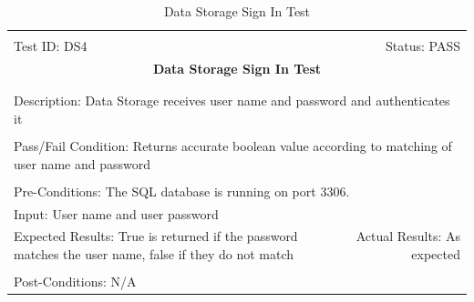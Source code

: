 \documentclass[11pt]{article}
\begin{document}
\begin{center}
\begin{table}[H]
\begin{tabular}{|l r|}\hline&\\[-2mm]
	Test ID: DS4	&Status: PASS\\[-3mm]
	\multicolumn{2}{|c|}{\textbf{\large{Data Storage Sign In Test}}}\\&\\\hline&\\[-3mm]
	\multicolumn{2}{|p{\textwidth}|}{Description: Data Storage receives user name and password and authenticates it}\\[1mm]\hline&\\[-3mm]
	\multicolumn{2}{|p{\textwidth}|}{Pass/Fail Condition: Returns accurate boolean value according to matching of user name and password}\\[1mm]\hline&\\[-3mm]
	\multicolumn{2}{|p{\textwidth}|}{Pre-Conditions: The SQL database is running on port 3306.}\\[4mm]
	\multicolumn{2}{|p{\textwidth}|}{Input: User name and user password}\\[2mm]\hline
	\multicolumn{1}{|p{0.49\textwidth}}{Expected Results: True is returned if the password matches the user name, false if they do not match}	&\multicolumn{1}{|p{0.45\textwidth}|}{Actual Results: As expected}\\\hline&\\[-3mm]
	\multicolumn{2}{|p{\textwidth}|}{Post-Conditions: N/A}\\\hline
\end{tabular}
\caption{Data Storage Sign In Test}
\end{table}
\end{center}
\end{document}
